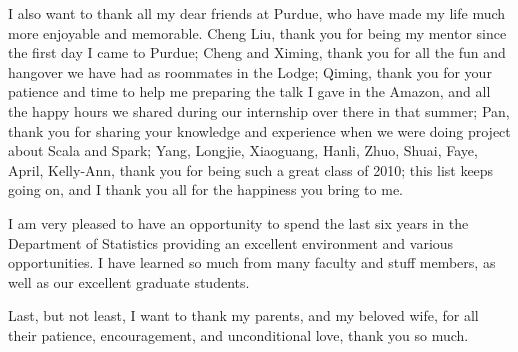 \begin{acknowledgments}
I also want to thank all my dear friends at Purdue, who have made my life much 
more enjoyable and memorable. Cheng Liu, thank you for being my mentor since the 
first day I came to Purdue; Cheng and Ximing, thank you for all the fun and 
hangover we have had as roommates in the Lodge; Qiming, thank you for your 
patience and time to help me preparing the talk I gave in the Amazon, and all the
happy hours we shared during our internship over there in that summer; Pan, thank 
you for sharing your knowledge and experience when we were doing project about 
Scala and Spark; Yang, Longjie, Xiaoguang, Hanli, Zhuo, Shuai, Faye, April, 
Kelly-Ann, thank you for being such a great class of 2010; this list keeps going
on, and I thank you all for the happiness you bring to me.

I am very pleased to have an opportunity to spend the last six years in the 
Department of Statistics providing an excellent environment and various 
opportunities. I have learned so much from many faculty and stuff members, as 
well as our excellent graduate students.

Last, but not least, I want to thank my parents, and my beloved wife, for all 
their patience, encouragement, and unconditional love, thank you so much.

\end{acknowledgments}


\tableofcontents

